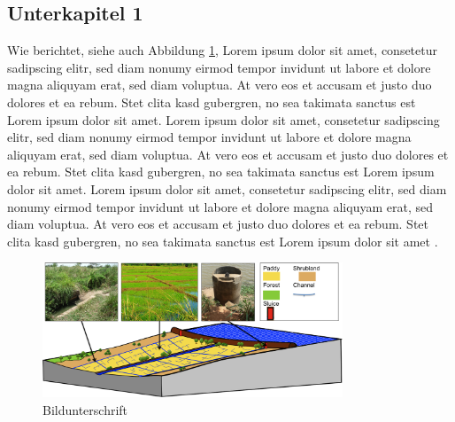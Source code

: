 \subsection{Unterkapitel 1}

Wie \cite{nachname_2005} berichtet, siehe auch Abbildung \ref{fig:Beispiel.png}, Lorem ipsum dolor sit amet, consetetur sadipscing elitr, sed diam nonumy eirmod tempor invidunt ut labore et dolore magna aliquyam erat, sed diam voluptua. At vero eos et accusam et justo duo dolores et ea rebum. Stet clita kasd gubergren, no sea takimata sanctus est Lorem ipsum dolor sit amet. Lorem ipsum dolor sit amet, consetetur sadipscing elitr, sed diam nonumy eirmod tempor invidunt ut labore et dolore magna aliquyam erat, sed diam voluptua. At vero eos et accusam et justo duo dolores et ea rebum. Stet clita kasd gubergren, no sea takimata sanctus est Lorem ipsum dolor sit amet. Lorem ipsum dolor sit amet, consetetur sadipscing elitr, sed diam nonumy eirmod tempor invidunt ut labore et dolore magna aliquyam erat, sed diam voluptua. At vero eos et accusam et justo duo dolores et ea rebum. Stet clita kasd gubergren, no sea takimata sanctus est Lorem ipsum dolor sit amet \citep[vgl.][gemäß freundlicher persönlicher Mitteilung]{nachname_2005}.

\begin{figure}[htb] %
\centering
\includegraphics[width=0.8\textwidth]{images/Beispiel.png} %
\caption[Bildunterschrift für das Abb.Verz.]{Bildunterschrift \citep[aus:][]{nachname_2005}}
\label{fig:Beispiel.png} %
\end{figure}



